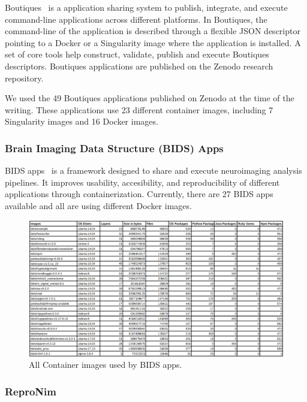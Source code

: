 \documentclass[a4paper,num-refs]{oup-contemporary}
\begin{document}
Boutiques~\cite{glatard2018boutiques} is a application sharing system to
publish, integrate, and execute command-line applications across different
platforms. In Boutiques, the command-line of the application is described
through a flexible JSON descriptor pointing to a Docker or a Singularity
image where the application is installed. A set of core tools help
construct, validate, publish and execute Boutiques descriptors. Boutiques
applications are published on the Zenodo research repository.

We used the 49 Boutiques applications published on Zenodo at the time of
the writing. These applications use 23 different container images,
including 7 Singularity images and 16 Docker images.

\subsubsection{Brain Imaging Data Structure (BIDS) Apps}

BIDS apps~\cite{gorgolewski2017bids} is a framework designed to share and execute neuroimaging
analysis pipelines. It improves usability, accesibility, and reproducibility
of different applications through containerization.
Currently, there are 27 BIDS apps available and all are using different Docker images.

\begin{figure}
  \centering
	\includegraphics[width=\columnwidth]{Figures/bids_table.png}
  \caption{All Container images used by BIDS apps.}
  \label{fig:bids_apps}
\end{figure}

\subsubsection{ReproNim}
\end{document}

